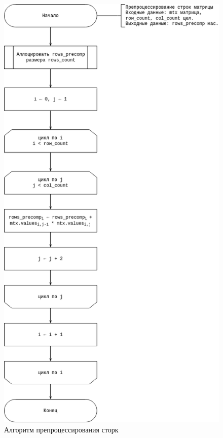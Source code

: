 \begin{figure}[H]
	\centering
	\includegraphics[width=0.7\linewidth]{assets/mtx-predproc-r.drawio.png}
	\caption{Алгоритм препроцессирования сторк}
	\label{fig:prep-r}
\end{figure}

